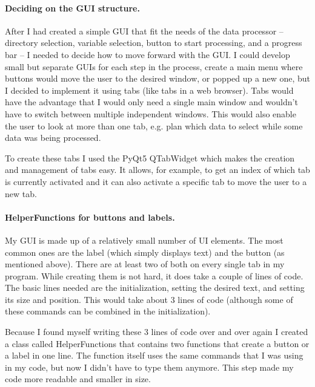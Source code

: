 \documentclass[../00_main.tex]{subfiles}
\begin{document}
\paragraph{Deciding on the GUI structure.} 

After I had created a simple GUI that fit the needs of the data processor -- 
directory selection, variable selection, button to start processing, and a 
progress bar -- I needed to decide how to move forward with the GUI. I could 
develop small but separate GUIs for each step in the process, create a main 
menu where buttons would move the user to the desired window, or popped up a 
new one, but I decided to implement it using tabs (like tabs in a web browser). 
Tabs would have the advantage that I would only need a single main window and 
wouldn't have to switch between multiple independent windows. This would also 
enable the user to look at more than one tab, e.g. plan which data to select 
while some data was being processed.\newline

To create these tabs I used the PyQt5 QTabWidget which makes the creation and 
management of tabs easy. It allows, for example, to get an index of which tab 
is currently activated and it can also activate a specific tab to move the user 
to a new tab.

\paragraph{HelperFunctions for buttons and labels.} 

My GUI is made up of a relatively small number of UI elements. The most common 
ones are the label (which simply displays text) and the button (as mentioned 
above). There are at least two of both on every single tab in my program. While 
creating them is not hard, it does take a couple of lines of code. The basic 
lines needed are the initialization, setting the desired text, and setting its 
size and position. This would take about 3 lines of code (although some of 
these commands can be combined in the initialization).\newline

Because I found myself writing these 3 lines of code over and over again I 
created a class called HelperFunctions that contains two functions that create
a button or a label in one line. The function itself uses the same commands 
that I was using in my code, but now I didn't have to type them anymore. This 
step made my code more readable and smaller in size.
\end{document}
